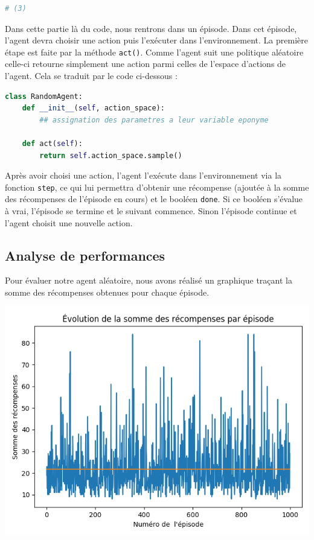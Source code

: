 \documentclass[10pt,a4paper]{article}
\begin{document}
\begin{lstlisting}[language=Python]
# (3)
\end{lstlisting}
Dans cette partie là du code, nous rentrons dans un épisode. Dans cet épisode, l'agent devra choisir une action puis l'exécuter dans l'environnement. La première étape est faite par la méthode \lstinline{act()}. Comme l'agent suit une politique aléatoire celle-ci retourne simplement une action parmi celles de l'espace d'actions de l'agent. Cela se traduit par le code ci-dessous :

\begin{lstlisting}[language=Python, caption=Implémentation de l'agent aléatoire]
class RandomAgent:
    def __init__(self, action_space):
        ## assignation des parametres a leur variable eponyme

    def act(self):
        return self.action_space.sample()
\end{lstlisting}
Après avoir choisi une action, l'agent l'exécute dans l'environnement via la fonction \lstinline{step}, ce qui lui permettra d'obtenir une récompense (ajoutée à la somme des récompenses de l'épisode en cours) et le booléen \lstinline{done}. Si ce booléen s'évalue à vrai, l'épisode se termine et le suivant commence. Sinon l'épisode continue et l'agent choisit une nouvelle action.

\subsection{Analyse de performances}


Pour évaluer notre agent aléatoire, nous avons réalisé un graphique traçant la somme des récompenses obtenues pour chaque épisode.

\includegraphics[scale=0.5]{evolution_recompenses_random.png} 
\end{document}
